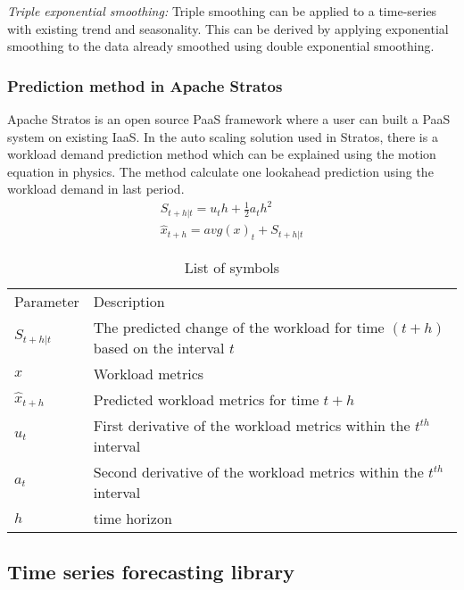 \textit{Triple exponential smoothing:} Triple smoothing can be applied to a time-series with existing trend and seasonality. This can be derived by applying exponential smoothing to the data already smoothed using double exponential smoothing.

\subsubsection{Prediction method in Apache Stratos}
Apache Stratos is an open source PaaS framework where a user can built a PaaS system on existing IaaS. In the auto scaling solution used in Stratos, there is a workload demand prediction method which can be explained using the motion equation in physics. The method calculate one lookahead prediction using the workload demand in last period\cite{StratosModel}.
\begin{eqnarray}
S_{t+h|t} = u_{t}h+ \frac{1}{2} a_{t}h^2 \\
\hat{x}_{t+h}=avg(x)_{t}  + S_{t+h|t} 
\end{eqnarray}

\begin{table}[]
\centering
\caption{List of symbols}
\label{my-label}
\begin{tabular}{ll}
Parameter       & Description                                                                     \\
$S_{t+h|t}$     & The predicted change of the workload for time $(t+h)$ based on the interval $t$ \\
$x$             & Workload metrics                                                                \\
$\hat{x}_{t+h}$ & Predicted workload metrics for time $t+h$                                       \\
$u_{t}$         & First derivative of the workload metrics within the $t^{th}$ interval           \\
$a_{t}$         & Second derivative of the workload metrics within the $t^{th}$ interval          \\
$h$             & time horizon                                                                   
\end{tabular}
\end{table}


\subsection{Time series forecasting library}

